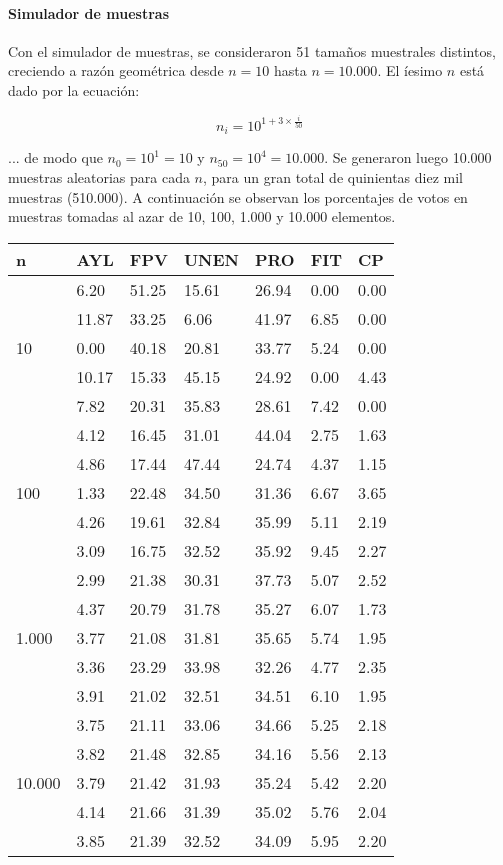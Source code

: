 \documentclass[12pt, a4paper]{article}
\begin{document}
\paragraph{Simulador de muestras}

Con el simulador de muestras, se consideraron 51 tama\~nos muestrales distintos, creciendo a raz\'on geom\'etrica desde $n=10$ hasta $n=10.000$. El \'iesimo $n$ est\'a dado por la ecuaci\'on:

$$ n_{i} = 10^{1 + 3 \times \frac{i}{50}} $$

... de modo que $n_{0}=10^{1}=10$ y $n_{50}=10^{4}=10.000$. Se generaron luego 10.000 muestras aleatorias para cada $n$, para un gran total de quinientas diez mil muestras (510.000). A continuaci\'on se observan los porcentajes de votos en muestras tomadas al azar de 10, 100, 1.000 y 10.000 elementos.

\begin{center}
	\begin{tabular}{l | llllll}
		n & AYL & FPV & UNEN & PRO & FIT & CP \\ \hline
\multirow{5}{*}{10} & 6.20 & 51.25 & 15.61 & 26.94 & 0.00 & 0.00 \\
& 11.87 & 33.25 & 6.06 & 41.97 & 6.85 & 0.00 \\
& 0.00 & 40.18 & 20.81 & 33.77 & 5.24 & 0.00 \\
& 10.17 & 15.33 & 45.15 & 24.92 & 0.00 & 4.43 \\
& 7.82 & 20.31 & 35.83 & 28.61 & 7.42 & 0.00 \\ \hline
\multirow{5}{*}{100} & 4.12 & 16.45 & 31.01 & 44.04 & 2.75 & 1.63 \\
& 4.86 & 17.44 & 47.44 & 24.74 & 4.37 & 1.15 \\
& 1.33 & 22.48 & 34.50 & 31.36 & 6.67 & 3.65 \\
& 4.26 & 19.61 & 32.84 & 35.99 & 5.11 & 2.19 \\
& 3.09 & 16.75 & 32.52 & 35.92 & 9.45 & 2.27 \\ \hline
\multirow{5}{*}{1.000} & 2.99 & 21.38 & 30.31 & 37.73 & 5.07 & 2.52 \\
& 4.37 & 20.79 & 31.78 & 35.27 & 6.07 & 1.73 \\
& 3.77 & 21.08 & 31.81 & 35.65 & 5.74 & 1.95 \\
& 3.36 & 23.29 & 33.98 & 32.26 & 4.77 & 2.35 \\ 
& 3.91 & 21.02 & 32.51 & 34.51 & 6.10 & 1.95 \\ \hline
\multirow{5}{*}{10.000} & 3.75 & 21.11 & 33.06 & 34.66 & 5.25 & 2.18 \\
& 3.82 & 21.48 & 32.85 & 34.16 & 5.56 & 2.13 \\
& 3.79 & 21.42 & 31.93 & 35.24 & 5.42 & 2.20 \\
& 4.14 & 21.66 & 31.39 & 35.02 & 5.76 & 2.04 \\
& 3.85 & 21.39 & 32.52 & 34.09 & 5.95 & 2.20 \\
	\end{tabular}
\end{center}
\end{document}
